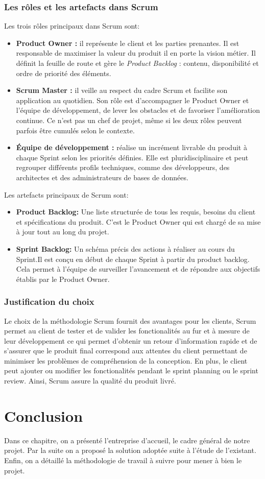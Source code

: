 \subsubsection {Les rôles et les artefacts dans Scrum}
Les trois rôles principaux dans Scrum sont:
 \begin{itemize}
\item[•] \textbf{Product Owner :} il représente le client et les parties prenantes. Il est responsable de maximiser la valeur du produit  il en porte la vision métier. Il définit la feuille de route et gère le \textit{Product Backlog} : contenu, disponibilité et ordre de priorité des éléments.
\vspace{0.16cm}
\newline
\item[•]\textbf{Scrum Master :} il veille au respect du cadre Scrum et facilite son application au quotidien. Son rôle est d'accompagner le Product Owner et l'équipe de développement, de lever les obstacles et de favoriser l'amélioration continue. Ce n'est pas un chef de projet, même si les deux rôles peuvent parfois être cumulés selon le contexte.
\vspace{0.16cm}
\item[•]\textbf{Équipe de développement :} réalise un incrément livrable du produit à chaque Sprint selon les priorités définies. Elle est pluridisciplinaire et peut regrouper différents profils techniques, comme des développeurs, des architectes et des administrateurs de bases de données.
 \end{itemize}
 Les artefacts principaux de Scrum sont:
  \begin{itemize}
\item[•] \textbf{Product Backlog:} Une liste structurée de tous les requis, besoins du client et spécifications du produit. C'est le Product Owner qui est chargé de sa mise à jour tout au long du projet.
\item[•] \textbf{Sprint Backlog:} Un schéma précis des actions à réaliser au cours du Sprint.Il est conçu en début de chaque Sprint à partir du product backlog. Cela permet à l'équipe de surveiller l'avancement et de répondre aux objectifs établis par le Product Owner.
 \end{itemize}
\subsubsection{Justification du choix}
Le choix de la méthodologie Scrum fournit des avantages pour les clients, Scrum permet au client de tester et de valider les fonctionalités au fur et à mesure de leur développement ce qui permet d'obtenir un retour d'information rapide et de s'assurer que le produit final correspond aux attentes du client permettant de minimiser les problèmes de compréhension de la conception. En plus, le client peut ajouter ou modifier les fonctionalités pendant le sprint planning ou le sprint review. Ainsi, Scrum assure la qualité du produit livré.

\section*{Conclusion}
Dans ce chapitre, on a présenté l'entreprise d'accueil, le cadre général de notre projet. Par la suite on a proposé la solution adoptée suite à l'étude de l'existant. Enfin, on a détaillé la méthodologie de travail à suivre pour mener à bien le projet. 

\newpage
